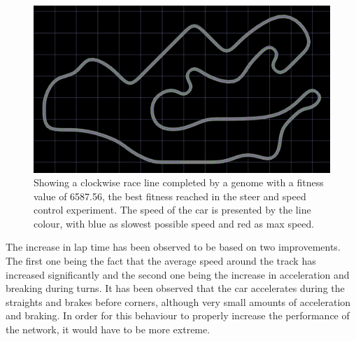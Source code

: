 \begin{figure}[h]
\includegraphics[width=\textwidth]{report/images/normal_generation_6558}
\centering
\caption{Showing a clockwise race line completed by a genome with a fitness value of 6587.56, the best fitness reached in the steer and speed control experiment. The speed of the car is presented by the line colour, with blue as slowest possible speed and red as max speed.}
\label{fig:steerspeedline}
\end{figure}

The increase in lap time has been observed to be based on two improvements. The first one being the fact that the average speed around the track has increased significantly and the second one being the increase in acceleration and breaking during turns. It has been observed that the car accelerates during the straights and brakes before corners, although very small amounts of acceleration and braking. In order for this behaviour to properly increase the performance of the network, it would have to be more extreme.


